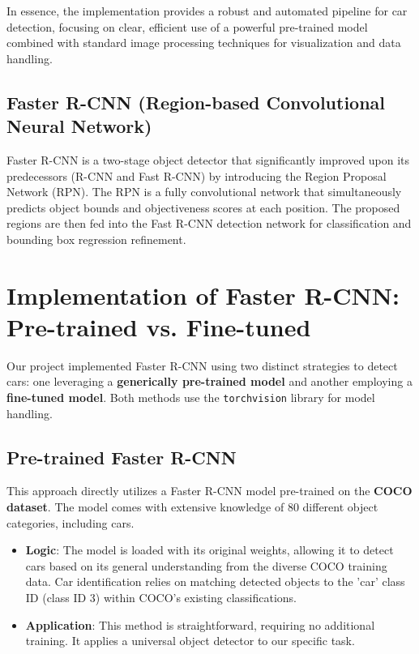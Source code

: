 \documentclass[12pt,a4paper]{article}
\begin{document}
In essence, the implementation provides a robust and automated pipeline for car detection, focusing on clear, efficient use of a powerful pre-trained model combined with standard image processing techniques for visualization and data handling.

\subsection{Faster R-CNN (Region-based Convolutional Neural Network)}
\label{ssec:fastrcnn}
Faster R-CNN is a two-stage object detector that significantly improved upon its predecessors (R-CNN and Fast R-CNN) by introducing the Region Proposal Network (RPN). The RPN is a fully convolutional network that simultaneously predicts object bounds and objectiveness scores at each position. The proposed regions are then fed into the Fast R-CNN detection network for classification and bounding box regression refinement. 

\section{Implementation of Faster R-CNN: Pre-trained vs. Fine-tuned}
\label{sec:fasterrcnn_implementations}

Our project implemented Faster R-CNN using two distinct strategies to detect cars: one leveraging a \textbf{generically pre-trained model} and another employing a \textbf{fine-tuned model}. Both methods use the \texttt{torchvision} library for model handling.

\subsection{Pre-trained Faster R-CNN}
This approach directly utilizes a Faster R-CNN model pre-trained on the \textbf{COCO dataset}. The model comes with extensive knowledge of 80 different object categories, including cars.

\begin{itemize}
    \item \textbf{Logic}: The model is loaded with its original weights, allowing it to detect cars based on its general understanding from the diverse COCO training data. Car identification relies on matching detected objects to the 'car' class ID (class ID 3) within COCO's existing classifications.
    \item \textbf{Application}: This method is straightforward, requiring no additional training. It applies a universal object detector to our specific task.
\end{itemize}
\end{document}
